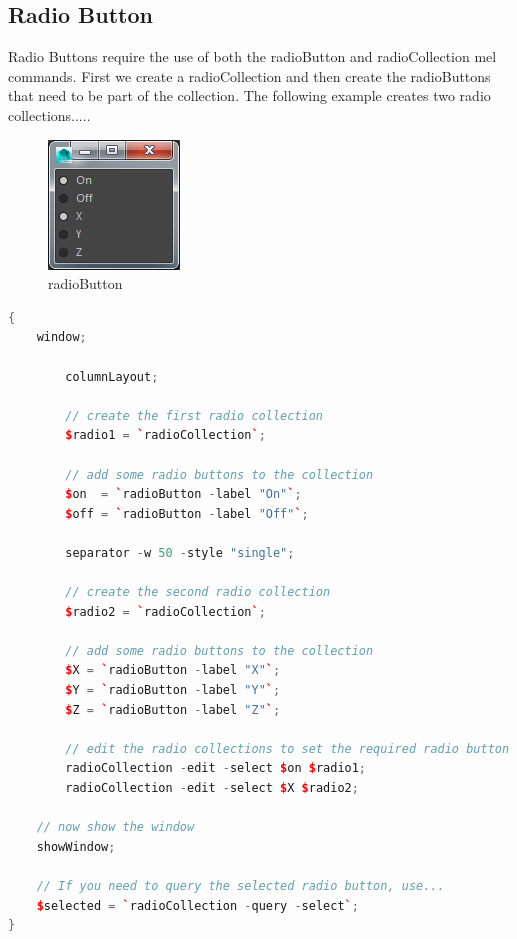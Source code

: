\subsection{Radio Button}
Radio Buttons require the use of both the radioButton and radioCollection mel commands. First we create a radioCollection and then create the radioButtons that need to be part of the collection. The following example creates two radio collections.....

\begin{figure}[tbh]
	\centering
	\includegraphics[width=0.4\linewidth]{figures/GUI/radioButton}
	\caption{radioButton}
	\label{fig:radiobutton}
\end{figure}

\begin{lstlisting}[language = C++]
{
	window;
	
		columnLayout;
		
		// create the first radio collection
		$radio1 = `radioCollection`;
		
		// add some radio buttons to the collection
		$on  = `radioButton -label "On"`;
		$off = `radioButton -label "Off"`;
		
		separator -w 50 -style "single";
		
		// create the second radio collection
		$radio2 = `radioCollection`;
		
		// add some radio buttons to the collection
		$X = `radioButton -label "X"`;
		$Y = `radioButton -label "Y"`;
		$Z = `radioButton -label "Z"`;
		
		// edit the radio collections to set the required radio button
		radioCollection -edit -select $on $radio1;
		radioCollection -edit -select $X $radio2;
	
	// now show the window
	showWindow;
	
	// If you need to query the selected radio button, use...
	$selected = `radioCollection -query -select`;
}
\end{lstlisting}

